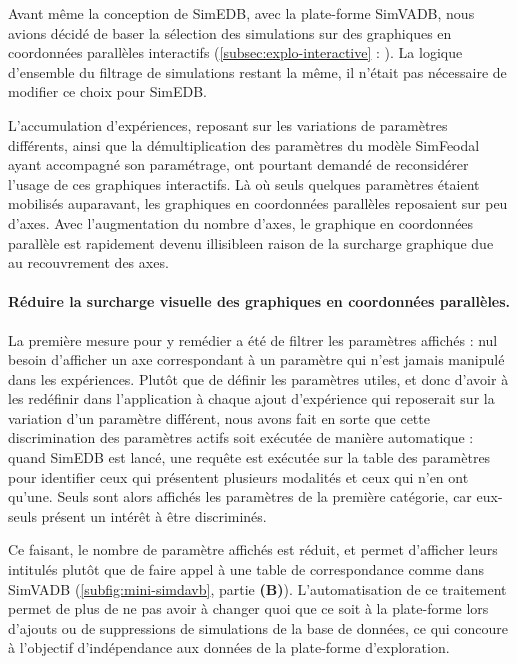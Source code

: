 Avant même la conception de SimEDB, avec la plate-forme SimVADB, nous avions décidé de baser la sélection des simulations sur des graphiques en coordonnées parallèles interactifs (\cref{subsec:explo-interactive} : \og {}\fg{}).
La logique d'ensemble du filtrage de simulations restant la même, il n'était pas nécessaire de modifier ce choix pour SimEDB.

L'accumulation d'expériences, reposant sur les variations de paramètres différents, ainsi que la démultiplication des paramètres du modèle SimFeodal ayant accompagné son paramétrage, ont pourtant demandé de reconsidérer l'usage de ces graphiques interactifs.
Là où seuls quelques paramètres étaient mobilisés auparavant, les graphiques en coordonnées parallèles reposaient sur peu d'axes.
Avec l'augmentation du nombre d'axes, le graphique en coordonnées parallèle est rapidement devenu illisibleen raison de la surcharge graphique due au recouvrement des axes.

\paragraph{Réduire la surcharge visuelle des graphiques en coordonnées parallèles.}

La première mesure pour y remédier a été de filtrer les paramètres affichés : nul besoin d'afficher un axe correspondant à un paramètre qui n'est jamais manipulé dans les expériences.
Plutôt que de définir les paramètres \og utiles\fg{}, et donc d'avoir à les redéfinir dans l'application à chaque ajout d'expérience qui reposerait sur la variation d'un paramètre différent, nous avons fait en sorte que cette discrimination des paramètres \og actifs\fg{} soit exécutée de manière automatique :
quand SimEDB est lancé, une requête est exécutée sur la table des paramètres pour identifier ceux qui présentent plusieurs modalités et ceux qui n'en ont qu'une.
Seuls sont alors affichés les paramètres de la première catégorie, car eux-seuls présent un intérêt à être discriminés.

Ce faisant, le nombre de paramètre affichés est réduit, et permet d'afficher leurs intitulés plutôt que de faire appel à une table de correspondance comme dans SimVADB (\cref{subfig:mini-simdavb}, partie \textbf{(B)}).
L'automatisation de ce traitement permet de plus de ne pas avoir à changer quoi que ce soit à la plate-forme lors d'ajouts ou de suppressions de simulations de la base de données, ce qui concoure à l'objectif d'indépendance aux données de la plate-forme d'exploration.

